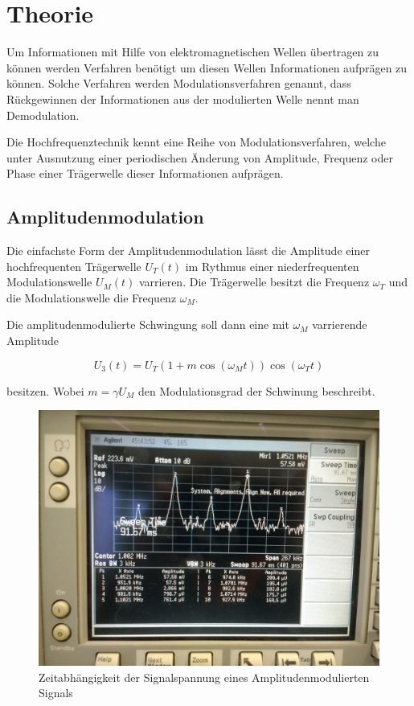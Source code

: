 \section{Theorie}
Um Informationen mit Hilfe von elektromagnetischen Wellen übertragen zu können werden Verfahren benötigt um diesen Wellen
Informationen aufprägen zu können. Solche Verfahren werden Modulationsverfahren genannt, dass Rückgewinnen der Informationen aus der 
modulierten Welle nennt man Demodulation.

Die Hochfrequenztechnik kennt eine Reihe von Modulationsverfahren, welche unter Ausnutzung einer periodischen Änderung von 
Amplitude, Frequenz oder Phase einer Trägerwelle dieser Informationen aufprägen.

\subsection{Amplitudenmodulation}
Die einfachste Form der Amplitudenmodulation lässt die Amplitude einer hochfrequenten Trägerwelle $U_T(t)$ im Rythmus einer niederfrequenten Modulationswelle $U_M(t)$ varrieren. Die Trägerwelle besitzt die Frequenz $\omega_T$ und die Modulationswelle die
Frequenz $\omega_M$.

Die amplitudenmodulierte Schwingung soll dann eine mit $\omega_M$ varrierende Amplitude

\begin{equation}
U_{3}(t) = U_T (1 + m \cos( \omega_M t))\cos(\omega_T t)
\label{eq:AmMod}
\end{equation} 

besitzen. Wobei $m = \gamma U_M$ den  Modulationsgrad der Schwinung beschreibt.

\begin{figure}
	\centering
	\includegraphics[width=\textwidth]{img/Aufgabenteil_b.jpg}
	\caption{Zeitabhängigkeit der Signalspannung eines Amplitudenmodulierten Signals}
\end{figure}

